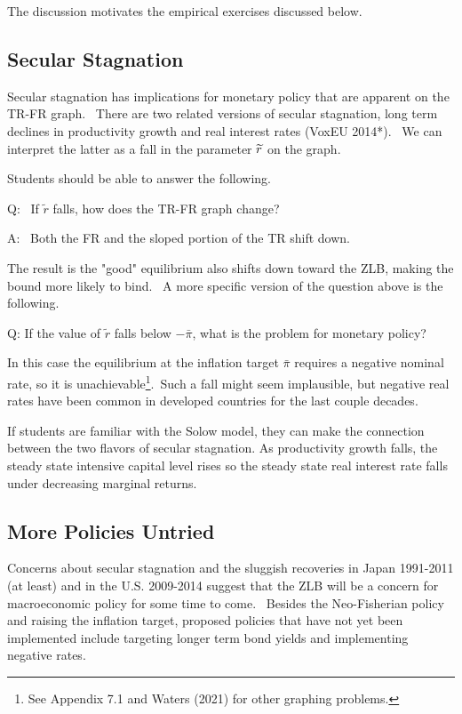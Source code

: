 \documentclass{article}
\begin{document}
\begin{doublespace}
The discussion motivates the empirical exercises discussed below.

\subsection{Secular Stagnation}

Secular stagnation has implications for monetary policy that are apparent on
the TR-FR graph. \ There are two related versions of secular stagnation,
long term declines in productivity growth and real interest rates (VoxEU
2014*). \ We can interpret the latter as a fall in the parameter $\widetilde{%
r}$ on the graph.

Students should be able to answer the following.

Q: \ If $\widetilde{r}$ falls, how does the TR-FR graph change?

A: \ Both the FR and the sloped portion of the TR shift down.

The result is the "good" equilibrium also shifts down toward the ZLB, making
the bound more likely to bind. \ A more specific version of the question
above is the following.

Q: If the value of $\widetilde{r}$ falls below $-\bar{\pi}$, what is the
problem for monetary policy?

In this case the equilibrium at the inflation target $\bar{\pi}$ requires a
negative nominal rate, so it is unachievable\footnote{%
See Appendix 7.1 and Waters (2021) for other graphing problems.}.\ Such a
fall might seem implausible, but negative real rates have been common in
developed countries for the last couple decades.

If students are familiar with the Solow model, they can make the connection
between the two flavors of secular stagnation. As productivity growth falls,
the steady state intensive capital level rises so the steady state real
interest rate falls under decreasing marginal returns.

\subsection{More Policies Untried}

Concerns about secular stagnation and the sluggish recoveries in Japan
1991-2011 (at least) and in the U.S. 2009-2014 suggest that the ZLB will be
a concern for macroeconomic policy for some time to come. \ Besides the
Neo-Fisherian policy and raising the inflation target, proposed policies
that have not yet been implemented include targeting longer term bond yields
and implementing negative rates.


\end{doublespace}
\end{document}
